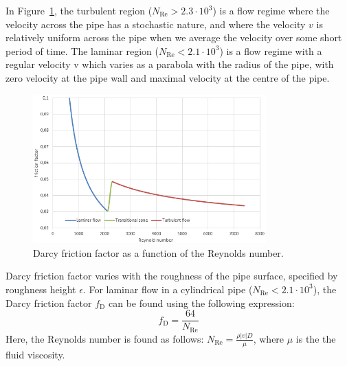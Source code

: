 \documentclass[%
]{USN-PhD}
\begin{document}
In Figure~\ref{fig:fig2}, the turbulent region ($N_\mathrm{Re} > 2.3\cdot10^3$) is a flow regime where the velocity across the pipe has a stochastic nature, and where the velocity $v$ is relatively uniform across the pipe when we average the velocity over some short period of time. The laminar region ($N_\mathrm{Re} < 2.1\cdot10^3$) is a flow regime with a regular velocity v which varies as a parabola with the radius of the pipe, with zero velocity at the pipe wall and maximal velocity at the centre of the pipe.
\begin{figure}[!ht]
  \centering
 \includegraphics[width=0.8\textwidth]{fig/darcyf}
 \caption{Darcy friction factor as a function of the Reynolds number.}
  \label{fig:fig2}
\end{figure}

Darcy friction factor varies with the roughness of the pipe surface, specified by roughness height $\epsilon$. For laminar flow in a cylindrical pipe ($N_\mathrm{Re} < 2.1\cdot10^3$), the Darcy friction factor $f_\mathrm{D}$ can be found using the following expression:
\begin{equation}\label{eq:eq2}
f_\mathrm{D}=\frac{64}{N_\mathrm{Re}}
\end{equation}
Here, the Reynolds number is found as follows: $N_\mathrm{Re}=\frac{\rho|v|D}{\mu}$, where $\mu$ is the the fluid viscosity.
\end{document}
